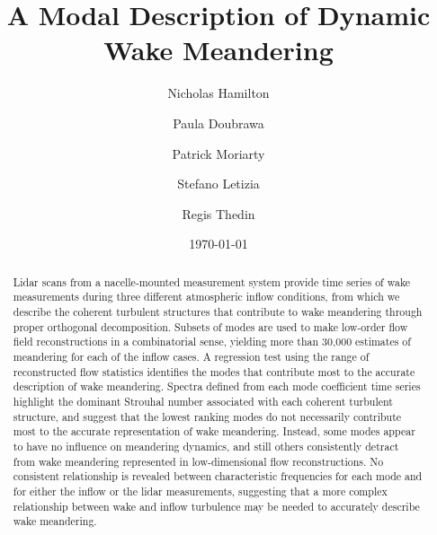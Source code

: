 \documentclass[%
 aip,
 amsmath,
 amssymb,
preprint,%
]{revtex4-2}
\begin{document}

\title{A Modal Description of Dynamic Wake Meandering}%

\author{Nicholas Hamilton}
\author{Paula Doubrawa}
\author{Patrick Moriarty}
\author{Stefano Letizia}
\author{Regis Thedin}

\date{\today}%

\begin{abstract}
Lidar scans from a nacelle-mounted measurement system provide time series of wake measurements during three different atmospheric inflow conditions, from which we describe the coherent turbulent structures that contribute to wake meandering through proper orthogonal decomposition. 
Subsets of modes are used to make low-order flow field reconstructions in a combinatorial sense, yielding more than 30,000 estimates of meandering for each of the inflow cases.
A regression test using the range of reconstructed flow statistics identifies the modes that contribute most to the accurate description of wake meandering.
Spectra defined from each mode coefficient time series highlight the dominant Strouhal number associated with each coherent turbulent structure, and suggest that the lowest ranking modes do not necessarily contribute most to the accurate representation of wake meandering. 
Instead, some modes appear to have no influence on meandering dynamics, and still others consistently detract from wake meandering represented in low-dimensional flow reconstructions.
No consistent relationship is revealed between characteristic frequencies for each mode and for either the inflow or the lidar measurements, suggesting that a more complex relationship between wake and inflow turbulence may be needed to accurately describe wake meandering.


\end{abstract}
\end{document}

